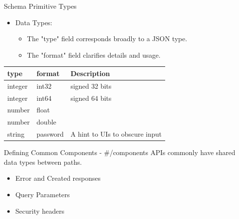 \documentclass[bigger]{beamer}
\begin{document}
\begin{frame}[label={sec:org1202539}]{Schema Primitive Types}
\begin{itemize}
\item Data Types:
\begin{itemize}
\item The "type" field corresponds broadly to a JSON type.
\item The "format" field clarifies details and usage.
\end{itemize}
\end{itemize}

\begin{center}
\begin{tabular}{lll}
\alert{type} & \alert{format} & \alert{Description}\\[0pt]
\hline
integer & int32 & signed 32 bits\\[0pt]
integer & int64 & signed 64 bits\\[0pt]
number & float & \\[0pt]
number & double & \\[0pt]
string & password & A hint to UIs to obscure input\\[0pt]
\end{tabular}
\end{center}
\end{frame}


\begin{frame}[label={sec:orgeb10ea8}]{Defining Common Components - \#/components}
APIs commonly have shared data types between paths.
\begin{itemize}
\item Error and Created responses
\item Query Parameters
\item Security headers
\end{itemize}

\end{frame}
\end{document}
